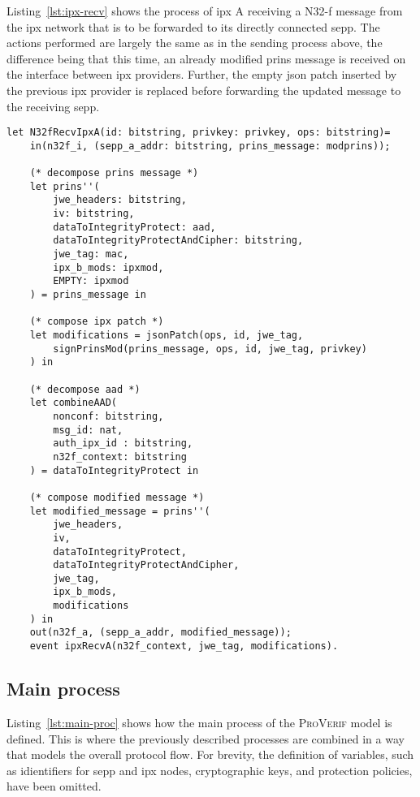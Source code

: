 Listing~\ref{lst:ipx-recv} shows the process of \gls{ipx} A receiving a N32-f message from the \gls{ipx} network that is to be forwarded to its directly connected \gls{sepp}.
The actions performed are largely the same as in the sending process above, the difference being that this time, an already modified \gls{prins} message is received on the interface between \gls{ipx} providers.
Further, the empty \gls{json} patch inserted by the previous \gls{ipx} provider is replaced before forwarding the updated message to the receiving \gls{sepp}.

\begin{lstlisting}[caption={Definition of the receiving IPX process},label={lst:ipx-recv},firstnumber=863]
let N32fRecvIpxA(id: bitstring, privkey: privkey, ops: bitstring)=
    in(n32f_i, (sepp_a_addr: bitstring, prins_message: modprins));

    (* decompose prins message *)
    let prins''(
        jwe_headers: bitstring,
        iv: bitstring,
        dataToIntegrityProtect: aad,
        dataToIntegrityProtectAndCipher: bitstring,
        jwe_tag: mac,
        ipx_b_mods: ipxmod,
        EMPTY: ipxmod
    ) = prins_message in

    (* compose ipx patch *)
    let modifications = jsonPatch(ops, id, jwe_tag,
        signPrinsMod(prins_message, ops, id, jwe_tag, privkey)
    ) in

    (* decompose aad *)
    let combineAAD(
        nonconf: bitstring,
        msg_id: nat,
        auth_ipx_id : bitstring,
        n32f_context: bitstring
    ) = dataToIntegrityProtect in

    (* compose modified message *)
    let modified_message = prins''(
        jwe_headers,
        iv,
        dataToIntegrityProtect,
        dataToIntegrityProtectAndCipher,
        jwe_tag,
        ipx_b_mods,
        modifications
    ) in
    out(n32f_a, (sepp_a_addr, modified_message));
    event ipxRecvA(n32f_context, jwe_tag, modifications).
\end{lstlisting}

\subsection{Main process}

Listing~\ref{lst:main-proc} shows how the main process of the \textsc{ProVerif} model is defined.
This is where the previously described processes are combined in a way that models the overall protocol flow.
For brevity, the definition of variables, such as idientifiers for \gls{sepp} and \gls{ipx} nodes, cryptographic keys, and protection policies, have been omitted.

